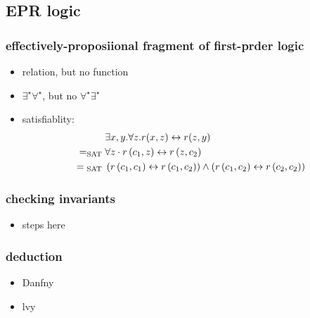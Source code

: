 \subsection{EPR logic}
\begin{frame}
    \frametitle{effectively-proposiional fragment of first-prder logic}
    \begin{itemize}
        \item relation, but no function
        \item $\exists^{\star} \forall ^{\star}$, but no $\forall^{\star} \exists ^{\star}$
        \item satisfiablity:
        \begin{align}
            &\exists x, y . \forall z . r(x, z) \leftrightarrow r(z, y) \notag\\
            = _{\text {SAT }}& \forall z \cdot r\left(c_{1}, z\right) \leftrightarrow r\left(z, c_{2}\right) \notag\\
            = { }_{\text {SAT }}&\left(r\left(c_{1}, c_{1}\right) \leftrightarrow r\left(c_{1}, c_{2}\right)\right) \wedge\left(r\left(c_{1}, c_{2}\right) \leftrightarrow r\left(c_{2}, c_{2}\right)\right)
        \end{align}
    \end{itemize}
\end{frame}
\begin{frame}
    \frametitle{checking invariants}
    \begin{itemize}
        \item steps here
    \end{itemize}
\end{frame}
\begin{frame}
    \frametitle{deduction}
    \begin{itemize}
        \item Danfny
        \item lvy
    \end{itemize}
\end{frame}